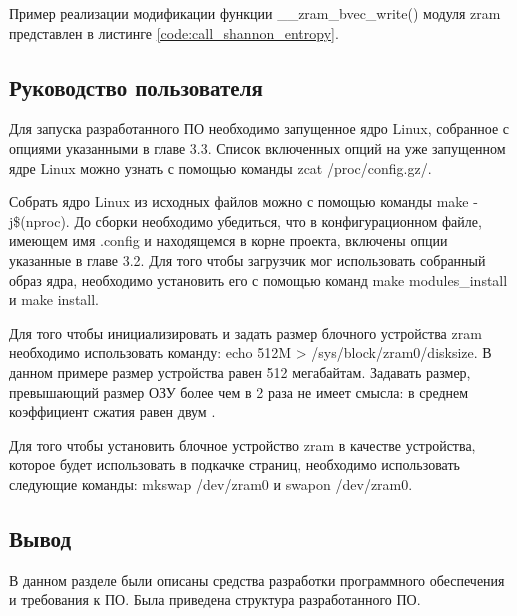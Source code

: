 Пример реализации модификации функции \_\_zram\_bvec\_write() модуля zram представлен в листинге \ref{code:call_shannon_entropy}.


\subsection{Руководство пользователя}

Для запуска разработанного ПО необходимо запущенное ядро Linux, собранное с опциями указанными в главе 3.3. Список включенных опций на уже запущенном ядре Linux можно узнать с помощью команды zcat /proc/config.gz/.

Собрать ядро Linux из исходных файлов можно с помощью команды make -j\$(nproc). До сборки необходимо убедиться, что в конфигурационном файле, имеющем имя .config и находящемся в корне проекта, включены опции указанные в главе 3.2. Для того чтобы загрузчик мог использовать собранный образ ядра, необходимо установить его с помощью команд  make modules\_install и make install.

Для того чтобы инициализировать и задать размер блочного устройства zram необходимо использовать команду: echo 512M > /sys/block/zram0/disksize. В данном примере размер устройства равен 512 мегабайтам. Задавать размер, превышающий размер ОЗУ более чем в 2 раза не имеет смысла: в среднем коэффициент сжатия равен двум \cite{zram}.

Для того чтобы установить блочное устройство zram в качестве устройства, которое будет использовать в подкачке страниц, необходимо использовать следующие команды: mkswap /dev/zram0 и swapon /dev/zram0.

\subsection{Вывод}

В данном разделе были описаны средства разработки программного обеспечения и требования к ПО. Была приведена структура разработанного ПО.
\pagebreak